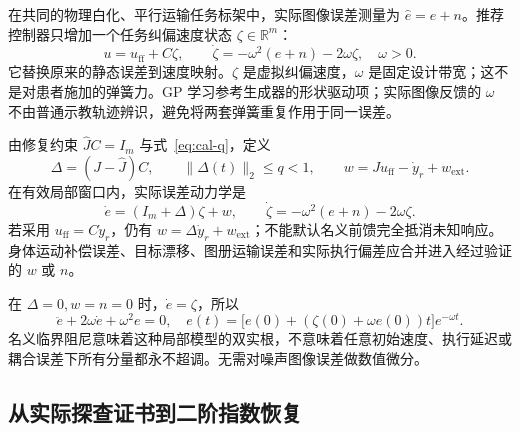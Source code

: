 \documentclass[11pt,a4paper]{article}
\numberwithin{equation}{section}
\theoremstyle{definition}
\newcommand{\R}{\mathbb R}
\begin{document}
在共同的物理白化、平行运输任务标架中，实际图像误差测量为 $\widehat e=e+n$。推荐控制器只增加一个任务纠偏速度状态 $\zeta\in\R^m$：
\begin{equation}
 \boxed{u=u_{\mathrm{ff}}+C\zeta,\qquad
 \dot\zeta=-\omega^2(e+n)-2\omega\zeta,\quad \omega>0.}
 \label{eq:cal-servo-second-order}
\end{equation}
它替换原来的静态误差到速度映射。$\zeta$ 是虚拟纠偏速度，$\omega$ 是固定设计带宽；这不是对患者施加的弹簧力。GP 学习参考生成器的形状驱动项；实际图像反馈的 $\omega$ 不由普通示教轨迹辨识，避免将两套弹簧重复作用于同一误差。

由修复约束 $\widehat JC=I_m$ 与式~\eqref{eq:cal-q}，定义
\begin{equation}
 \Delta=(J-\widehat J)C,\qquad
 \|\Delta(t)\|_2\le q<1,
 \qquad
 w=Ju_{\mathrm{ff}}-\dot y_r+w_{\mathrm{ext}}.
 \label{eq:cal-feedback-residual}
\end{equation}
在有效局部窗口内，实际误差动力学是
\begin{equation}
 \boxed{\dot e=(I_m+\Delta)\zeta+w,\qquad
 \dot\zeta=-\omega^2(e+n)-2\omega\zeta.}
 \label{eq:cal-error-dynamics}
\end{equation}
若采用 $u_{\mathrm{ff}}=C\dot y_r$，仍有 $w=\Delta\dot y_r+w_{\mathrm{ext}}$；不能默认名义前馈完全抵消未知响应。身体运动补偿误差、目标漂移、图册运输误差和实际执行偏差应合并进入经过验证的 $w$ 或 $n$。

在 $\Delta=0,w=n=0$ 时，$\dot e=\zeta$，所以
\begin{equation}
 \ddot e+2\omega\dot e+\omega^2e=0,
 \quad
 e(t)=\bigl[e(0)+(\zeta(0)+\omega e(0))t\bigr]e^{-\omega t}.
 \label{eq:cal-nominal-second-order}
\end{equation}
名义临界阻尼意味着这种局部模型的双实根，不意味着任意初始速度、执行延迟或耦合误差下所有分量都永不超调。无需对噪声图像误差做数值微分。

\subsection{从实际探查证书到二阶指数恢复}
\end{document}
